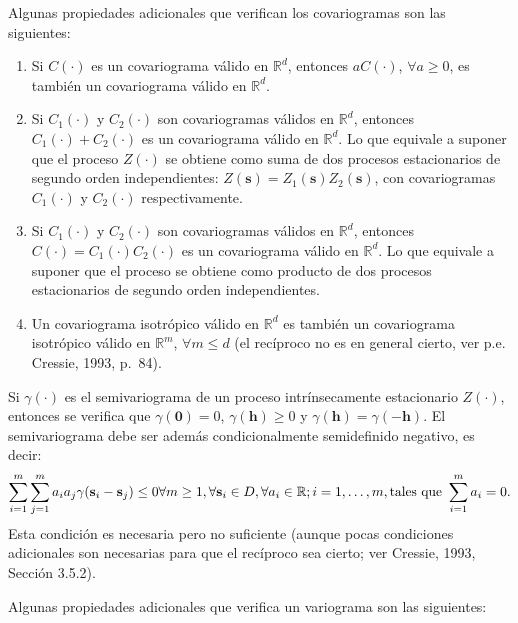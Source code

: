 \documentclass[
  spanish,
]{book}
\theoremstyle{break}
\begin{document}
Algunas propiedades adicionales que verifican los covariogramas son las siguientes:

\begin{enumerate}
\def\labelenumi{\arabic{enumi}.}
\item
  Si \(C(\cdot)\) es un covariograma válido en \(\mathbb{R}^d\), entonces \(aC(\cdot)\), \(\forall a\geq 0\), es
  también un covariograma válido en \(\mathbb{R}^d\).
\item
  Si \(C_1 (\cdot)\) y \(C_2 (\cdot)\) son covariogramas válidos en \(\mathbb{R}^d\), entonces \(C_1 (\cdot) + C_2 (\cdot)\) es un
  covariograma válido en \(\mathbb{R}^d\). Lo que equivale a suponer que el proceso \(Z(\cdot)\) se obtiene como suma de dos procesos estacionarios de segundo orden independientes: \(Z(\mathbf{s})=Z_1 (\mathbf{s})Z_2 (\mathbf{s})\), con covariogramas \(C_1 (\cdot)\) y \(C_2 (\cdot)\) respectivamente.
\item
  Si \(C_1 (\cdot)\) y \(C_2 (\cdot)\) son covariogramas válidos en \(\mathbb{R}^d\), entonces \(C(\cdot) = C_1 (\cdot)C_2 (\cdot)\)
  es un covariograma válido en \(\mathbb{R}^d\). Lo que equivale a suponer que el proceso se obtiene como producto de dos procesos estacionarios de segundo orden independientes.
\item
  Un covariograma isotrópico válido en \(\mathbb{R}^d\) es también un covariograma isotrópico válido en \(\mathbb{R}^m\), \(\forall m\leq d\) (el recíproco no es en general cierto, ver p.e. Cressie, 1993, p.~84).
\end{enumerate}

Si \(\gamma (\cdot)\) es el semivariograma de un proceso intrínsecamente estacionario \(Z(\cdot)\), entonces se verifica que \(\gamma (\mathbf{0})=0\), \(\gamma (\mathbf{h})\geq 0\) y \(\gamma (\mathbf{h})=\gamma (-\mathbf{h})\).
El semivariograma debe ser además condicionalmente semidefinido negativo, es decir:
\[\sum\limits_{i=1}^{m}\sum\limits_{j=1}^{m}a_i a_j \gamma(\mathbf{s}_i -\mathbf{s}_j) \leq 0  \\
\forall m\geq 1,\forall \mathbf{s}_i \in D,\forall a_i \in \mathbb{R};i=1, \ldots,m,\text{tales que } \sum\limits_{i=1}^{m}a_i = 0.\]
Esta condición es necesaria pero no suficiente (aunque pocas condiciones adicionales son necesarias para que el recíproco sea cierto; ver Cressie, 1993, Sección 3.5.2).

Algunas propiedades adicionales que verifica un variograma son las siguientes:
\end{document}
